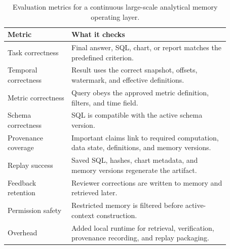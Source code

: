 \documentclass[10pt]{article}
\begin{document}
\begin{table}[p]
\centering
\small
\begin{tabular}{L{0.25\linewidth}L{0.62\linewidth}}
\toprule
\textbf{Metric} & \textbf{What it checks} \\
\midrule
Task correctness & Final answer, SQL, chart, or report matches the predefined criterion. \\
Temporal correctness & Result uses the correct snapshot, offsets, watermark, and effective definitions. \\
Metric correctness & Query obeys the approved metric definition, filters, and time field. \\
Schema correctness & SQL is compatible with the active schema version. \\
Provenance coverage & Important claims link to required computation, data state, definitions, and memory versions. \\
Replay success & Saved SQL, hashes, chart metadata, and memory versions regenerate the artifact. \\
Feedback retention & Reviewer corrections are written to memory and retrieved later. \\
Permission safety & Restricted memory is filtered before active-context construction. \\
Overhead & Added local runtime for retrieval, verification, provenance recording, and replay packaging. \\
\bottomrule
\end{tabular}
\caption{Evaluation metrics for a continuous large-scale analytical memory operating layer.}
\label{tab:metrics}
\end{table}
\end{document}
